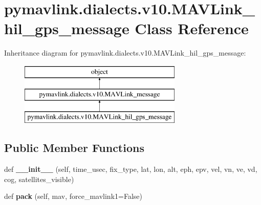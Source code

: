 \hypertarget{classpymavlink_1_1dialects_1_1v10_1_1MAVLink__hil__gps__message}{}\section{pymavlink.\+dialects.\+v10.\+M\+A\+V\+Link\+\_\+hil\+\_\+gps\+\_\+message Class Reference}
\label{classpymavlink_1_1dialects_1_1v10_1_1MAVLink__hil__gps__message}
Inheritance diagram for pymavlink.\+dialects.\+v10.\+M\+A\+V\+Link\+\_\+hil\+\_\+gps\+\_\+message\+:\begin{figure}[H]
\begin{center}
\leavevmode
\includegraphics[height=3.000000cm]{classpymavlink_1_1dialects_1_1v10_1_1MAVLink__hil__gps__message}
\end{center}
\end{figure}
\subsection*{Public Member Functions}
\begin{DoxyCompactItemize}
\item 
\mbox{\label{classpymavlink_1_1dialects_1_1v10_1_1MAVLink__hil__gps__message_a45337b351c73b19122765dd947a5b790}} 
def {\bfseries \+\_\+\+\_\+init\+\_\+\+\_\+} (self, time\+\_\+usec, fix\+\_\+type, lat, lon, alt, eph, epv, vel, vn, ve, vd, cog, satellites\+\_\+visible)
\item 
\mbox{\label{classpymavlink_1_1dialects_1_1v10_1_1MAVLink__hil__gps__message_ab94583c0736d2919270f895a6e5517fa}} 
def {\bfseries pack} (self, mav, force\+\_\+mavlink1=False)
\end{DoxyCompactItemize}

